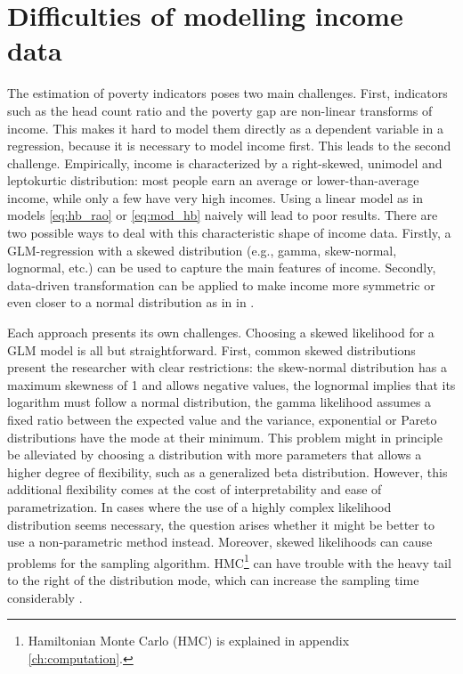 \section{Difficulties of modelling income data}
\label{ch:difficulties}
The estimation of poverty indicators poses two main challenges.
First, indicators such as the head count ratio and the poverty gap are non-linear transforms of income.
This makes it hard to model them directly as a dependent variable in a regression, because it is necessary to model income first.
This leads to the second challenge.
Empirically, income is characterized by a right-skewed, unimodel and leptokurtic distribution:
most people earn an average or lower-than-average income, while only a few have very high incomes.
Using a linear model as in models \ref{eq:hb_rao} or \ref{eq:mod_hb} naively will lead to poor results.
There are two possible ways to deal with this characteristic shape of income data.
Firstly, a GLM-regression with a skewed distribution (e.g., gamma, skew-normal, lognormal, etc.) can be used to capture the main features of income.
Secondly, data-driven transformation can be applied to make income more symmetric or even closer to a normal distribution as in in \cite{rojas_perilla_data_2020}.

Each approach presents its own challenges.
Choosing a skewed likelihood for a GLM model is all but straightforward.
First, common skewed distributions present the researcher with clear restrictions:
the skew-normal distribution has a maximum skewness of 1 and allows negative values, the lognormal implies that its logarithm must follow a normal distribution, the gamma likelihood assumes a fixed ratio between the expected value and the variance, exponential or Pareto distributions have the mode at their minimum.
This problem might in principle be alleviated by choosing a distribution with more parameters that allows a higher degree of flexibility, such as a generalized beta distribution.
However, this additional flexibility comes at the cost of interpretability and ease of parametrization.
In cases where the use of a highly complex likelihood distribution seems necessary, the question arises whether it might be better to use a non-parametric method instead.
Moreover, skewed likelihoods can cause problems for the sampling algorithm. HMC\footnote{Hamiltonian Monte Carlo (HMC) is explained in appendix \ref{ch:computation}.} can have trouble with the heavy tail to the right of the distribution mode, which can increase the sampling time considerably \citep{betancourt_conceptual_2017}.

